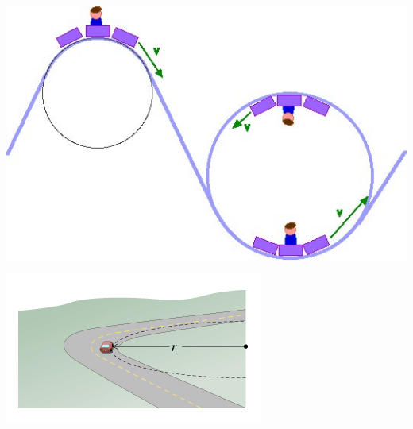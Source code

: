 \begin{center}
\begin{minipage}{.45\textwidth}
\includegraphics[width=\textwidth]{content-10-3.jpg}
\end{minipage} \hfill
\begin{minipage}{.45\textwidth}
\includegraphics[width=\textwidth]{content-10-4.jpg}
\end{minipage}
\end{center}
